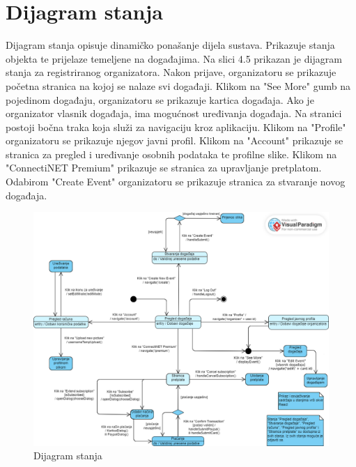 			\eject
		
		\newpage
		\section{Dijagram stanja}
			
			
			Dijagram stanja opisuje dinamičko ponašanje dijela sustava.
			Prikazuje stanja objekta te prijelaze temeljene na događajima.
			Na slici 4.5 prikazan je dijagram stanja za registriranog organizatora.
			Nakon prijave, organizatoru se prikazuje početna stranica na kojoj se nalaze svi događaji.
			Klikom na "See More" gumb na pojedinom događaju, organizatoru se prikazuje kartica događaja.
			Ako je organizator vlasnik događaja, ima mogućnost uređivanja događaja.
			Na stranici postoji bočna traka koja služi za navigaciju kroz aplikaciju.
			Klikom na "Profile" organizatoru se prikazuje njegov javni profil.
			Klikom na "Account" prikazuje se stranica za pregled i uređivanje osobnih podataka te profilne slike.
			Klikom na "ConnectiNET Premium" prikazuje se stranica za upravljanje pretplatom.
			Odabirom "Create Event" organizatoru se prikazuje stranica za stvaranje novog događaja.


			\begin{figure}[htbp]
				\centering
				\includegraphics[width=1\textwidth]{dijagrami/dijagram_stanja.png}
				\caption{Dijagram stanja}
			\end{figure}
			
